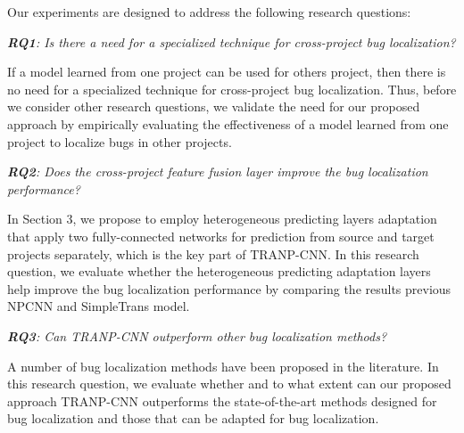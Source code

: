 
Our experiments are designed to address the following research questions:

\vspace{0.2cm}\noindent\textit{\textbf{RQ1}: Is there a need for a specialized technique for cross-project bug localization?}

If a model learned from one project can be used for others project, then there is no need for a specialized technique for cross-project bug localization. Thus, before we consider other research questions, we validate the need for our proposed approach by empirically evaluating the effectiveness of a model learned from one project to localize bugs in other projects.

\vspace{0.2cm}\noindent\textit{\textbf{RQ2}: Does the cross-project feature fusion layer improve the bug localization performance?}


In Section 3, we propose to employ heterogeneous predicting layers adaptation that apply two fully-connected networks for prediction from source and target projects separately, which is the key part of TRANP-CNN. In this research question, we evaluate whether the heterogeneous predicting adaptation layers help improve the bug localization performance by comparing the results previous NPCNN and SimpleTrans model. 

\vspace{0.2cm}\noindent\textit{\textbf{RQ3}: Can TRANP-CNN outperform other bug localization methods?}

A number of bug localization methods have been proposed in the literature. In this research question, we evaluate whether and to what extent can our proposed approach TRANP-CNN outperforms the state-of-the-art methods designed for bug localization and those that can be adapted for bug localization. 